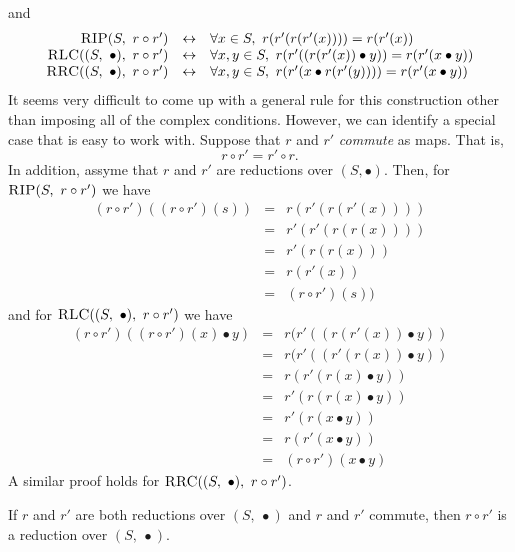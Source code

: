 and 
\[
\begin{array}{rcl}
\text{\textsc{RIP}}(S,\ r \circ r')    
    & \leftrightarrow 
    & \forall x \in S,\ r(r'(r(r'(x)))) = r(r'(x))\\
\text{\textsc{RLC}}((S,\ \bullet),\ r \circ r')
    & \leftrightarrow 
    & \forall x, y \in S,\ r(r'((r(r'(x)) \bullet y)) = r(r'(x \bullet y))\\ 
\text{\textsc{RRC}}((S,\ \bullet),\ r \circ r')
    & \leftrightarrow 
    & \forall x, y \in S,\ r(r'(x \bullet r(r'(y)))) = r(r'(x \bullet y))\\ 
\end{array}   
\]
It seems very difficult to come up with a general rule for this construction
other than imposing all of the complex conditions. 
However, we can identify a special case that is easy to work with.
Suppose that $r$ and $r'$ \emph{commute} as maps. 
That is, 
\[
r \circ r' = r' \circ r. 
\]
In addition, assyme that
$r$ and $r'$ are reductions over $(S, \bullet)$. 
Then, for 
$\text{\textsc{RIP}}(S,\ r \circ r')$
we have
\[
\begin{array}{rcl}
(r \circ r')((r \circ r')(s))
  & =
  & r(r'(r(r'(x)))) \\
  & =  
  & r'(r'(r(r(x)))) \\ 
  & = 
    & r'(r(r(x))) \\
    & = 
    & r(r'(x))\\
    & =   
    & (r \circ r')(s))
\end{array}   
\] 
and for 
$\text{\textsc{RLC}}((S,\ \bullet),\ r \circ r')$
we have
\[
\begin{array}{rcl}
  (r \circ r')((r \circ r')(x) \bullet y)
  & =  
  & r(r'((r(r'(x)) \bullet y)) \\ 
  & =
  & r(r'((r'(r(x)) \bullet y)) \\
  & =
  & r(r'(r(x) \bullet y)) \\
  & =
  & r'(r(r(x) \bullet y)) \\
  & =
  & r'(r(x \bullet y)) \\
  & =
  & r(r'(x \bullet y)) \\
  & =  
  & (r \circ r')(x \bullet y)
\end{array}   
\] 
A similar proof holds for
$\text{\textsc{RRC}}((S,\ \bullet),\ r \circ r')$. 

\begin{theorem}
  If $r$ and $r'$ are both reductions over $(S,\ \bullet)$ and
  $r$ and $r'$ commute, then 
  $r \circ r'$ is a reduction over $(S,\ \bullet)$. 
\end{theorem}

